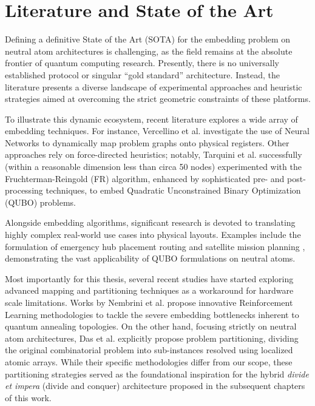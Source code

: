 \section{Literature and State of the Art}
\label{sec:SOTA}

Defining a definitive State of the Art (SOTA) for the embedding problem on neutral atom architectures is challenging, as the field remains at the absolute frontier of quantum computing research. Presently, there is no universally established protocol or singular ``gold standard'' architecture. Instead, the literature presents a diverse landscape of experimental approaches and heuristic strategies aimed at overcoming the strict geometric constraints of these platforms.

To illustrate this dynamic ecosystem, recent literature explores a wide array of embedding techniques. For instance, Vercellino et al. \cite{Vercellino_2022} investigate the use of Neural Networks to dynamically map problem graphs onto physical registers. Other approaches rely on force-directed heuristics; notably, Tarquini et al. \cite{tarquini2026dronedeliverypackingproblem} successfully (within a reasonable dimension less than circa 50 nodes) experimented with the Fruchterman-Reingold (FR) algorithm, enhanced by sophisticated pre- and post-processing techniques, 
to embed Quadratic Unconstrained Binary Optimization (QUBO) problems.

Alongside embedding algorithms, significant research is devoted to translating highly complex real-world use cases into physical layouts. Examples include the formulation of emergency hub placement routing \cite{tarquini2026emergencyhubplacementneutralatom} and satellite mission planning \cite{nowak2026satellitemissionplanningrydberg}, demonstrating the vast applicability of QUBO formulations on neutral atoms.


Most importantly for this thesis, several recent studies have started exploring advanced mapping and partitioning techniques as a workaround for hardware scale limitations. Works by Nembrini et al. \cite{nembrini2024application, Nembrini_2026} propose innovative Reinforcement Learning methodologies to tackle the severe embedding bottlenecks inherent to quantum annealing topologies. On the other hand, focusing strictly on neutral atom architectures, Das et al. \cite{das2025grid} explicitly propose problem partitioning, dividing the original combinatorial problem into sub-instances resolved using localized atomic arrays. While their specific methodologies differ from our scope, these partitioning strategies served as the foundational inspiration for the hybrid \textit{divide et impera} (divide and conquer) architecture proposed in the subsequent chapters of this work.

